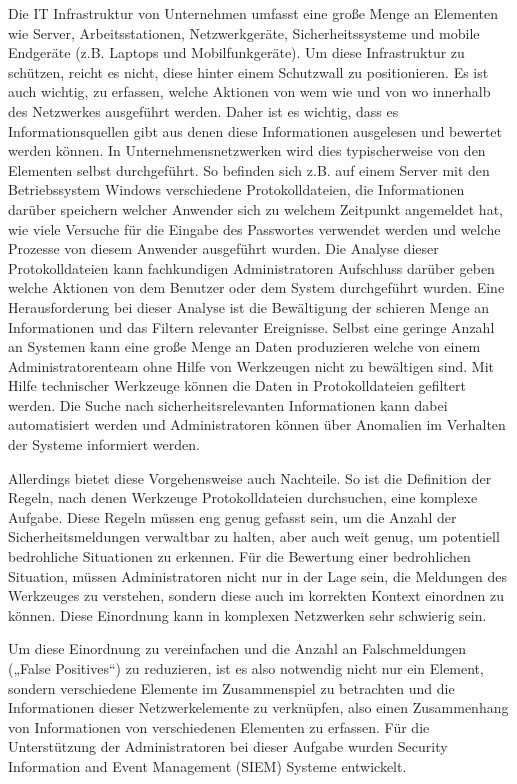 Die IT Infrastruktur von Unternehmen umfasst eine große Menge an Elementen wie Server, Arbeitsstationen, Netzwerkgeräte, Sicherheitssysteme und mobile Endgeräte (z.B. Laptops und Mobilfunkgeräte). Um diese Infrastruktur zu schützen, reicht es nicht, diese hinter einem Schutzwall zu positionieren. Es ist auch wichtig, zu erfassen, welche Aktionen von wem wie und von wo innerhalb des Netzwerkes ausgeführt werden. Daher ist es wichtig, dass es Informationsquellen gibt aus denen diese Informationen ausgelesen und bewertet werden können. In Unternehmensnetzwerken wird dies typischerweise von den Elementen selbst durchgeführt. So befinden sich z.B. auf einem Server mit den Betriebssystem Windows verschiedene Protokolldateien, die Informationen darüber speichern welcher Anwender sich zu welchem Zeitpunkt angemeldet hat, wie viele Versuche für die Eingabe des Passwortes verwendet werden und welche Prozesse von diesem Anwender ausgeführt wurden. 
Die Analyse dieser Protokolldateien kann fachkundigen Administratoren Aufschluss darüber geben welche Aktionen von dem Benutzer oder dem System durchgeführt wurden. Eine Herausforderung bei dieser Analyse ist die Bewältigung der schieren Menge an Informationen und das Filtern relevanter Ereignisse. Selbst eine geringe Anzahl an Systemen kann eine große Menge an Daten produzieren welche von einem Administratorenteam ohne Hilfe von Werkzeugen nicht zu bewältigen sind. Mit Hilfe technischer Werkzeuge können die Daten in Protokolldateien gefiltert werden. Die Suche nach sicherheitsrelevanten Informationen kann dabei automatisiert werden und Administratoren können über Anomalien im Verhalten der Systeme informiert werden. 

Allerdings bietet diese Vorgehensweise auch Nachteile. So ist die Definition der Regeln, nach denen Werkzeuge Protokolldateien durchsuchen, eine komplexe Aufgabe. Diese Regeln müssen eng genug gefasst sein, um die Anzahl der Sicherheitsmeldungen verwaltbar zu halten, aber auch weit genug, um potentiell bedrohliche Situationen zu erkennen. Für die Bewertung einer bedrohlichen Situation, müssen Administratoren nicht nur in der Lage sein, die Meldungen des Werkzeuges zu verstehen, sondern diese auch im korrekten Kontext einordnen zu können. Diese Einordnung kann in komplexen Netzwerken sehr schwierig sein.

Um diese Einordnung zu vereinfachen und die Anzahl an Falschmeldungen („False Positives“) zu reduzieren, ist es also notwendig nicht nur ein Element, sondern verschiedene Elemente im Zusammenspiel zu betrachten und die Informationen dieser Netzwerkelemente zu verknüpfen, also einen Zusammenhang von Informationen von verschiedenen Elementen zu erfassen. Für die Unterstützung der Administratoren bei dieser Aufgabe wurden Security Information and Event Management (SIEM) Systeme entwickelt.

